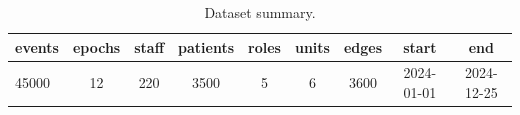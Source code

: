 \begin{table}[htbp]
\centering
\caption{Dataset summary.}
\label{tab:dataset-summary}
\begin{tabular}{@{}lcccccccc@{}}
\toprule
events & epochs & staff & patients & roles & units & edges & start & end \\
\midrule
45000 & 12 & 220 & 3500 & 5 & 6 & 3600 & 2024-01-01 & 2024-12-25 \\
\bottomrule
\end{tabular}
\end{table}
